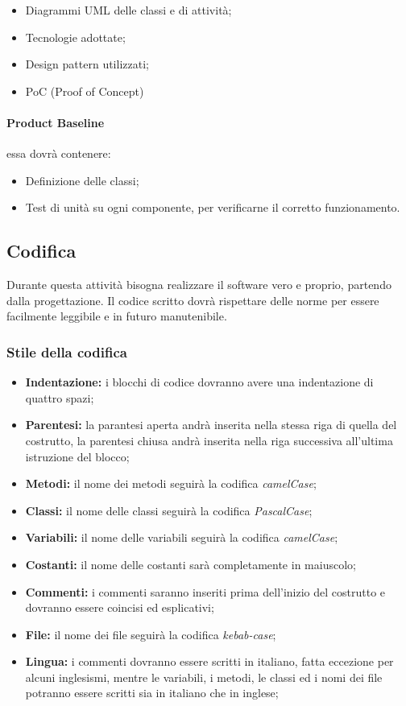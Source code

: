 \begin{itemize}
    \item Diagrammi UML delle classi e di attività;
    \item Tecnologie adottate;
    \item Design pattern utilizzati;
    \item PoC (Proof of Concept)
\end{itemize}

\paragraph{Product Baseline} essa dovrà contenere:

\begin{itemize}
    \item Definizione delle classi;
    \item Test di unità su ogni componente, per verificarne il corretto funzionamento.
\end{itemize}

\subsection{Codifica}
Durante questa attività bisogna realizzare il software vero e proprio, partendo dalla progettazione.
Il codice scritto dovrà rispettare delle norme per essere facilmente leggibile e in futuro manutenibile.

\subsubsection{Stile della codifica}

\begin{itemize}
    \item \textbf{Indentazione:} i blocchi di codice dovranno avere una indentazione di quattro spazi;
    \item \textbf{Parentesi:} la parantesi aperta andrà inserita nella stessa riga di quella del costrutto, la parentesi chiusa andrà inserita nella riga successiva all'ultima istruzione del blocco;
    \item \textbf{Metodi:} il nome dei metodi seguirà la codifica \textit{camelCase};
    \item \textbf{Classi:} il nome delle classi seguirà la codifica \textit{PascalCase};
    \item \textbf{Variabili:} il nome delle variabili seguirà la codifica \textit{camelCase};
    \item \textbf{Costanti:} il nome delle costanti sarà completamente in maiuscolo;
    \item \textbf{Commenti:} i commenti saranno inseriti prima dell'inizio del costrutto e dovranno essere coincisi ed esplicativi;
    \item \textbf{File:} il nome dei file seguirà la codifica \textit{kebab-case};
    \item \textbf{Lingua:} i commenti dovranno essere scritti in italiano, fatta eccezione per alcuni inglesismi, mentre le variabili, i metodi, le classi ed i nomi dei file potranno essere scritti sia in italiano che in inglese;
\end{itemize}